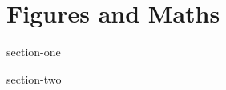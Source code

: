 \blankpage
\chapter{\label{ch:figuresnadmath}Figures and Maths}

\begin{chapterabstract}

\lipsum[1]

\end{chapterabstract}

\blankpage
{section-one}

\blankpage
{section-two}



